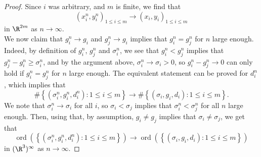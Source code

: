 \begin{proof}
Since $i$ was arbitrary, and $m$ is finite, we find that 
$$(x_i^n,y_i^n)_{1\leq i\leq m}\to (x_i,y_i)_{1\leq i\leq m}$$
in $\R^{2m}$ as $n\to \infty$. \\
We now claim that $g_i^n\to g_i$ and $g_j^n\to g_i$ implies that $g_i^n=g_j^n$ for $n$ large enough. Indeed, by definition of $g_i^n$, $g_j^n$ and $\sigma_i^n$, we see that $g_i^n<g_j^n$ implies that $g_j^n-g_i^n\geq \sigma_i^n$, and by the argument above, $\sigma_i^n\to \sigma_i>0$, so $g_i^n-g^n_j\to 0$ can only hold if $g_i^n=g_j^n$ for $n$ large enough. The equivalent statement can be proved for $d_i^n$, which implies that 
$$\#\left\{(\sigma_i^n,g_i^n,d_i^n):1\leq i \leq m\right\}\to \#\left\{(\sigma_i,g_i,d_i):1\leq i \leq m\right\}.$$
We note that $\sigma^n_i\to \sigma_i$ for all $i$, so  $\sigma_i<\sigma_j$ implies that $\sigma^n_i<\sigma^n_j$ for all $n$ large enough. Then, using that, by assumption, $g_i\neq g_j$  implies that $\sigma_i\neq \sigma_j$, we get that
$$\operatorname{ord}\left(\left\{(\sigma_i^n,g_i^n,d_i^n):1\leq i \leq m\right\}\right)\to \operatorname{ord}\left(\left\{(\sigma_i,g_i,d_i):1\leq i \leq m\right\}\right)$$
in $(\R^{3})^\infty$ as $n\to \infty$.
\end{proof}

